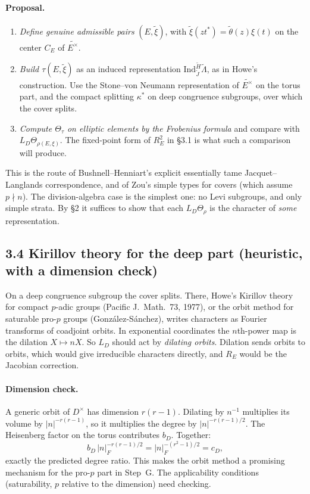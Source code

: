\documentclass[11pt]{article}
\newcommand{\tH}{\widetilde H}
\theoremstyle{plain}
\begin{document}
\paragraph{Proposal.}
\begin{enumerate}[label=(\arabic*)]
\item \emph{Define genuine admissible pairs} $(E,\tilde\xi)$, with
$\tilde\xi(zt^*)=\tilde\theta(z)\xi(t)$ on the center $C_E$ of
$\widetilde{E^\times}$.
\item \emph{Build $\tau(E,\tilde\xi)$} as an induced representation
$\mathrm{Ind}_{\tilde J}^{\tH}\tilde\Lambda$, as in Howe's construction.
Use the Stone--von Neumann representation of $\widetilde{E^\times}$ on
the torus part, and the compact splitting $\kappa^*$ on deep congruence
subgroups, over which the cover splits.
\item \emph{Compute $\Theta_\tau$ on elliptic elements by the Frobenius
formula} and compare with $L_D\Theta_{\rho(E,\xi)}$. The fixed-point
form of $R_E^2$ in \S3.1 is what such a comparison will produce.
\end{enumerate}
This is the route of Bushnell--Henniart's explicit essentially tame
Jacquet--Langlands correspondence, and of Zou's simple types for covers
(which assume $p\nmid n$). The division-algebra case is the simplest
one: no Levi subgroups, and only simple strata. By \S2 it suffices to
show that each $L_D\Theta_\rho$ is the character of \emph{some}
representation.

\subsection*{3.4 Kirillov theory for the deep part (heuristic, with a dimension check)}
On a deep congruence subgroup the cover splits. There, Howe's Kirillov
theory for compact $p$-adic groups (Pacific J.\ Math.\ 73, 1977), or the
orbit method for saturable pro-$p$ groups (Gonz\'alez-S\'anchez), writes
characters as Fourier transforms of coadjoint orbits. In exponential
coordinates the $n$th-power map is the dilation $X\mapsto nX$. So $L_D$
should act by \emph{dilating orbits}. Dilation sends orbits to orbits,
which would give irreducible characters directly, and $R_E$ would be
the Jacobian correction.

\paragraph{Dimension check.} A generic orbit of $D^\times$ has
dimension $r(r-1)$. Dilating by $n^{-1}$ multiplies its volume by
$|n|^{-r(r-1)}$, so it multiplies the degree by $|n|^{-r(r-1)/2}$. The
Heisenberg factor on the torus contributes $b_D$. Together:
\[
b_D\,|n|_F^{-r(r-1)/2}=|n|_F^{-(r^2-1)/2}=c_D,
\]
exactly the predicted degree ratio. This makes the orbit method a
promising mechanism for the pro-$p$ part in Step~G. The applicability
conditions (saturability, $p$ relative to the dimension) need checking.
\end{document}
